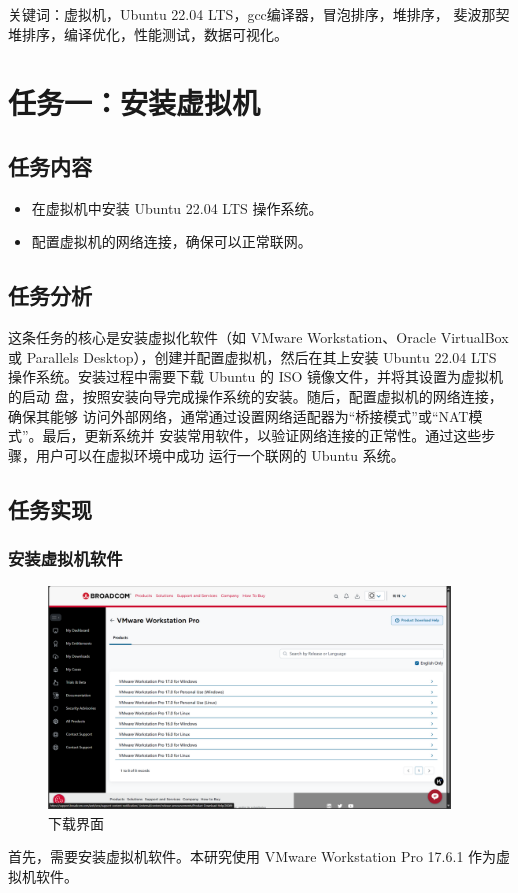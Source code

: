 \documentclass[UTF8]{ctexart}
\begin{document}
关键词：虚拟机，Ubuntu 22.04 LTS，gcc编译器，冒泡排序，堆排序，
斐波那契堆排序，编译优化，性能测试，数据可视化。

\section{任务一：安装虚拟机}
\subsection{任务内容}
\begin{itemize}
    \item 在虚拟机中安装 Ubuntu 22.04 LTS 操作系统。
    \item 配置虚拟机的网络连接，确保可以正常联网。
\end{itemize}

\subsection{任务分析}
这条任务的核心是安装虚拟化软件（如 VMware Workstation、Oracle VirtualBox 
或 Parallels Desktop），创建并配置虚拟机，然后在其上安装 Ubuntu 22.04 LTS 
操作系统。安装过程中需要下载 Ubuntu 的 ISO 镜像文件，并将其设置为虚拟机的启动
盘，按照安装向导完成操作系统的安装。随后，配置虚拟机的网络连接，确保其能够
访问外部网络，通常通过设置网络适配器为“桥接模式”或“NAT模式”。最后，更新系统并
安装常用软件，以验证网络连接的正常性。通过这些步骤，用户可以在虚拟环境中成功
运行一个联网的 Ubuntu 系统。

\subsection{任务实现}
\subsubsection{安装虚拟机软件}
\begin{figure}[H]
    \centering
    \includegraphics[width=0.95\textwidth]{picture/Screenshot 2024-10-14 095239.png}
    \caption{下载界面}
\end{figure}
首先，需要安装虚拟机软件。本研究使用 VMware Workstation Pro 17.6.1 
作为虚拟机软件。
\end{document}
